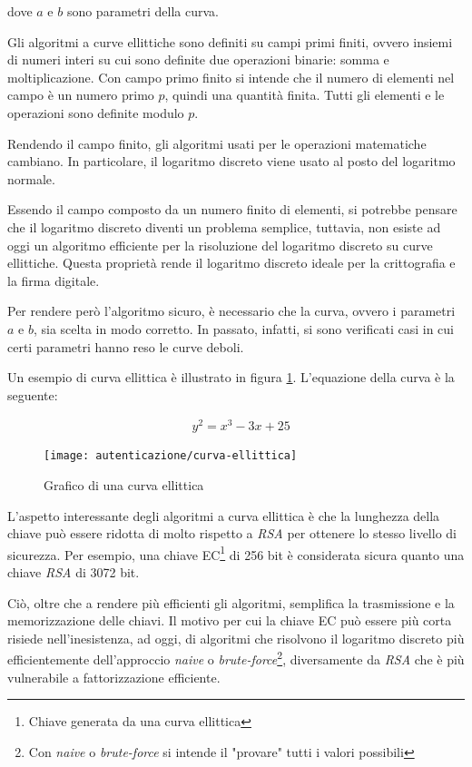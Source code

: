 \noindent dove $a$ e $b$ sono parametri della curva.

Gli algoritmi a curve ellittiche sono definiti su campi primi finiti, ovvero insiemi di numeri interi su cui sono definite due operazioni binarie: somma e moltiplicazione.
Con campo primo finito si intende che il numero di elementi nel campo è un numero primo $p$, quindi una quantità finita. Tutti gli elementi e le operazioni sono definite modulo $p$.

Rendendo il campo finito, gli algoritmi usati per le operazioni matematiche cambiano.
In particolare, il logaritmo discreto viene usato al posto del logaritmo normale.

Essendo il campo composto da un numero finito di elementi, si potrebbe pensare che il logaritmo discreto diventi un problema semplice, tuttavia, non esiste ad oggi un algoritmo efficiente per la risoluzione del logaritmo discreto su curve ellittiche.
Questa proprietà rende il logaritmo discreto ideale per la crittografia e la firma digitale.

Per rendere però l'algoritmo sicuro, è necessario che la curva, ovvero i parametri $a$ e $b$, sia scelta in modo corretto. In passato, infatti, si sono verificati casi in cui certi parametri hanno reso le curve deboli.

\noindent Un esempio di curva ellittica è illustrato in figura \ref{fig:curva-ellittica}. L'equazione della curva è la seguente:

\begin{equation}
	\begin{aligned}
		&y^2 = x^3 - 3x + 25
	\end{aligned}
\end{equation}


\begin{figure}[!ht] 
    \centering 
    \texttt{[image: autenticazione/curva-ellittica]} 
    \caption{Grafico di una curva ellittica}
	\label{fig:curva-ellittica}
\end{figure}

L'aspetto interessante degli algoritmi a curva ellittica è che la lunghezza della chiave può essere ridotta di molto rispetto a \emph{RSA} per ottenere lo stesso livello di sicurezza.
Per esempio, una chiave EC\footnote{Chiave generata da una curva ellittica} di 256 bit è considerata sicura quanto una chiave \emph{RSA} di 3072 bit.

Ciò, oltre che a rendere più efficienti gli algoritmi, semplifica la trasmissione e la memorizzazione delle chiavi.
Il motivo per cui la chiave EC può essere più corta risiede nell'inesistenza, ad oggi, di algoritmi che risolvono il logaritmo discreto più efficientemente dell'approccio \emph{naive} o \emph{brute-force}\footnote{Con \emph{naive} o \emph{brute-force} si intende il "provare" tutti i valori possibili}, diversamente da \emph{RSA} che è più vulnerabile a fattorizzazione efficiente.

